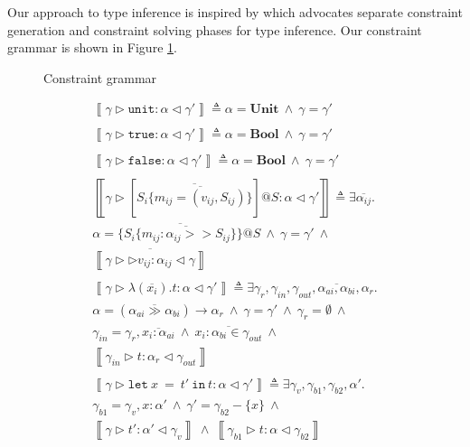 \documentclass[preprint]{sigplanconf}
\newcommand{\figref}[1]{Figure \ref{#1}}
\newcommand{\inferrule}[4]{\left\llbracket #1 \triangleright #2 : #3 \triangleleft #4 \right\rrbracket}
\newcommand{\inferlhs}[1]{\left\llbracket \gamma \triangleright #1 : \alpha \triangleleft \gamma' \right\rrbracket}
\newcommand{\unitv}{\mathtt{unit}}
\newcommand{\unitt}{\mathbf{Unit}}
\newcommand{\truev}{\mathtt{true}}
\newcommand{\falsev}{\mathtt{false}}
\newcommand{\boolt}{\mathbf{Bool}}
\newcommand{\lett}[3]{\mathtt{let}\:#1\:\mathtt{=}\:#2\:\mathtt{in}\:#3}
\newcommand{\cand}{\:\wedge\:}
\begin{document}
Our approach to type inference is inspired by \cite{Pottier2005} which advocates
separate constraint generation and constraint solving phases for
type inference. Our constraint grammar is shown in \figref{fig:congrammar}.

\begin{figure}
\ottgrammartabular{
\ottC\ottinterrule
\ottctxc\ottinterrule
\otttyc\ottinterrule
\otttinf\ottinterrule
}
\caption{\label{fig:congrammar} Constraint grammar}
\end{figure}

\begin{figure}
\[
\begin{array}{l}

\inferlhs{\unitv} \triangleq \alpha = \unitt \cand \gamma = \gamma' 
\\\\

\inferlhs{\truev} \triangleq \alpha = \boolt \cand \gamma = \gamma' 
\\\\

\inferlhs{\falsev} \triangleq \alpha = \boolt \cand \gamma = \gamma' 
\\\\

\inferlhs{[ \overline{S_i \{ \overline{ m_{ij} = (v_{ij}, S_{ij}) } \} }]@S}
\triangleq
\exists \overline{\alpha_{ij}} . \\
\alpha = \{ \overline{ S_i \{ \overline{ m_{ij} : \alpha_{ij} >> S_{ij} } \} }\}@S
\cand
\gamma = \gamma'
\cand \\
\overline{\inferrule{\gamma}{\triangleright v_{ij}}{\alpha_{ij}}{\gamma}}
\\\\

\inferlhs{\lambda ( \overline{x_i} ) . t} \triangleq
\exists \gamma_r, \gamma_{in}, \gamma_{out}, \overline{\alpha_{ai}, \alpha_{bi}}, \alpha_r . \\
\alpha = (\overline{\alpha_{ai} \gg \alpha_{bi}}) \rightarrow \alpha_r
\cand
\gamma = \gamma'
\cand
\gamma_r = \emptyset
\cand \\
\gamma_{in} = \gamma_r, \overline{x_i : \alpha_{ai}}
\cand
\overline{x_i : \alpha_{bi} \in \gamma_{out}}
\cand
\\
\inferrule{\gamma_{in}}{t}{\alpha_r}{\gamma_{out}}
\\\\

\inferlhs{\lett{x}{t'}{t}} \triangleq \exists \gamma_v, \gamma_{b1}, \gamma_{b2}, \alpha' . \\
\gamma_{b1} = \gamma_v, x : \alpha'
\cand
\gamma' = \gamma_{b2} - \{ x \}
\cand \\
\inferrule{\gamma}{t'}{\alpha'}{\gamma_v}
\cand
\inferrule{\gamma_{b1}}{t}{\alpha}{\gamma_{b2}}
\\\\


\end{array}\]
\end{figure}
\end{document}
